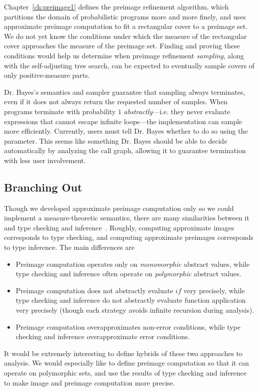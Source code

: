 Chapter~\ref{ch:preimage1} defines the preimage refinement algorithm, which partitions the domain of probabilistic programs more and more finely, and uses approximate preimage computation to fit a rectangular cover to a preimage set.
We do not yet know the conditions under which the measure of the rectangular cover approaches the measure of the preimage set.
Finding and proving these conditions would help us determine when preimage refinement \emph{sampling}, along with the self-adjusting tree search, can be expected to eventually sample covers of only positive-measure parts.

Dr. Bayes's semantics and sampler guarantee that sampling always terminates, even if it does not always return the requested number of samples.
When programs terminate with probability $1$ \emph{abstractly}---i.e. they never evaluate expressions that cannot escape infinite loops---the implementation can sample more efficiently.
Currently, users must tell Dr. Bayes whether to do so using the  parameter.
This seems like something Dr. Bayes should be able to decide automatically by analyzing the call graph, allowing it to guarantee termination with less user involvement.

\subsection{Branching Out}

Though we developed approximate preimage computation only so we could implement a measure-theoretic semantics, there are many similarities between it and type checking and inference~\cite{cit:pierce-2002-tpl}.
Roughly, computing approximate images corresponds to type checking, and computing approximate preimages corresponds to type inference.
The main differences are
\begin{itemize}
	\item Preimage computation operates only on \emph{monomorphic} abstract values, while type checking and inference often operate on \emph{polymorphic} abstract values.
	\item Preimage computation does not abstractly evaluate $if$ very precisely, while type checking and inference do not abstractly evaluate function application very precisely
	(though each strategy avoids infinite recursion during analysis).
	\item Preimage computation overapproximates non-error conditions, while type checking and inference overapproximate error conditions.
\end{itemize}
It would be extremely interesting to define hybrids of these two approaches to analysis.
We would especially like to define preimage computation so that it can operate on polymorphic sets, and use the results of type checking and inference to make image and preimage computation more precise.

